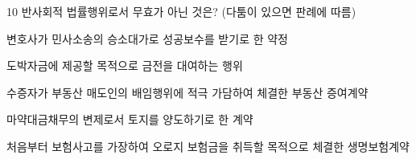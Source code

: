\begin{question}{10}
반사회적 법률행위로서 무효가 아닌 것은? (다툼이 있으면 판례에 따름)
\begin{choices}
  \item 변호사가 민사소송의 승소대가로 성공보수를 받기로 한 약정
  \item 도박자금에 제공할 목적으로 금전을 대여하는 행위
  \item 수증자가 부동산 매도인의 배임행위에 적극 가담하여 체결한 부동산 증여계약
  \item 마약대금채무의 변제로서 토지를 양도하기로 한 계약
  \item 처음부터 보험사고를 가장하여 오로지 보험금을 취득할 목적으로 체결한 생명보험계약
\end{choices}
\end{question}
